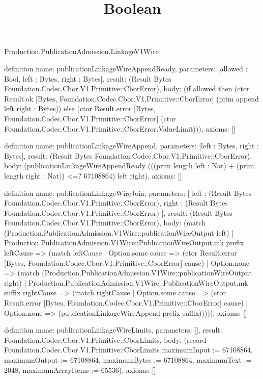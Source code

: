 \begin{lexlean}{Production.PublicationAdmission.LinkageV1Wire}
\title{Boolean}
\begin{semanticmodule}
definition{
  name: publicationLinkageWireAppendReady,
  parameters: [allowed : Bool, left : Bytes, right : Bytes],
  result: (Result Bytes Foundation.Codec.Cbor.V1.Primitive::CborError),
  body: (if allowed then (ctor Result.ok [Bytes, Foundation.Codec.Cbor.V1.Primitive::CborError] (prim append left right : Bytes)) else (ctor Result.error [Bytes, Foundation.Codec.Cbor.V1.Primitive::CborError] (ctor Foundation.Codec.Cbor.V1.Primitive::CborError.ValueLimit))),
  axioms: []
}

definition{
  name: publicationLinkageWireAppend,
  parameters: [left : Bytes, right : Bytes],
  result: (Result Bytes Foundation.Codec.Cbor.V1.Primitive::CborError),
  body: (publicationLinkageWireAppendReady (((prim length left : Nat) + (prim length right : Nat)) <=? 67108864) left right),
  axioms: []
}

definition{
  name: publicationLinkageWireJoin,
  parameters: [
    left : (Result Bytes Foundation.Codec.Cbor.V1.Primitive::CborError),
    right : (Result Bytes Foundation.Codec.Cbor.V1.Primitive::CborError)
  ],
  result: (Result Bytes Foundation.Codec.Cbor.V1.Primitive::CborError),
  body: (match (Production.PublicationAdmission.V1Wire::publicationWireOutput left)
    | Production.PublicationAdmission.V1Wire::PublicationWireOutput.mk prefix leftCause => (match leftCause
      | Option.some cause => (ctor Result.error [Bytes, Foundation.Codec.Cbor.V1.Primitive::CborError] cause)
      | Option.none => (match (Production.PublicationAdmission.V1Wire::publicationWireOutput right)
        | Production.PublicationAdmission.V1Wire::PublicationWireOutput.mk suffix rightCause => (match rightCause
          | Option.some cause => (ctor Result.error [Bytes, Foundation.Codec.Cbor.V1.Primitive::CborError] cause)
          | Option.none => (publicationLinkageWireAppend prefix suffix))))),
  axioms: []
}

definition{
  name: publicationLinkageWireLimits,
  parameters: [],
  result: Foundation.Codec.Cbor.V1.Primitive::CborLimits,
  body: (record Foundation.Codec.Cbor.V1.Primitive::CborLimits {maximumInput := 67108864, maximumOutput := 67108864, maximumBytes := 67108864, maximumText := 2048, maximumArrayItems := 65536}),
  axioms: []
}


\end{semanticmodule}
\end{lexlean}
